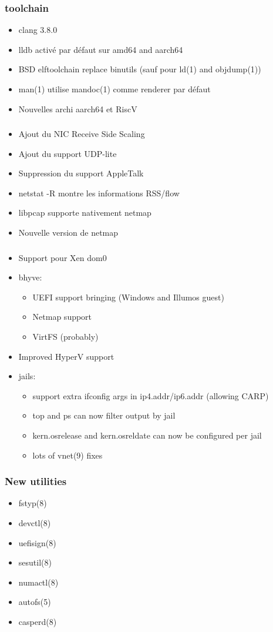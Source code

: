 \begin{frame}
	\frametitle{toolchain}
	\begin{itemize}
		\item clang 3.8.0
		\item lldb activé par défaut sur amd64 and aarch64
		\item BSD elftoolchain replace binutils (sauf pour ld(1) and objdump(1))
		\item man(1) utilise mandoc(1) comme renderer par défaut
		\item Nouvelles archi aarch64 et RiscV
	\end{itemize}
\end{frame}

\begin{frame}
	\frametitle{}
	\begin{itemize}
		\item Ajout du NIC Receive Side Scaling
		\item Ajout du support UDP-lite
		\item Suppression du support AppleTalk
		\item netstat -R montre les informations RSS/flow
		\item libpcap supporte nativement netmap
		\item Nouvelle version de netmap
	\end{itemize}
\end{frame}

\begin{frame}
	\frametitle{}
	\begin{itemize}
		\item Support pour Xen dom0
		\item bhyve:
			\begin{itemize}
				\item UEFI support bringing (Windows and Illumos guest)
				\item Netmap support
				\item VirtFS (probably)
			\end{itemize}
		\item Improved HyperV support
		\item jails:
			\begin{itemize}
				\item support extra ifconfig args in ip4.addr/ip6.addr (allowing CARP)
				\item top and ps can now filter output by jail
				\item kern.osrelease and kern.osreldate can now be configured per jail
				\item lots of vnet(9) fixes
			\end{itemize}
	\end{itemize}
\end{frame}

\begin{frame}
	\frametitle{New utilities}
	\begin{itemize}
		\item fstyp(8)
		\item devctl(8)
		\item uefisign(8)
		\item sesutil(8)
		\item numactl(8)
		\item autofs(5)
		\item casperd(8)
	\end{itemize}
\end{frame}


